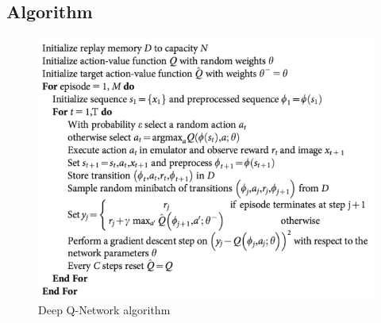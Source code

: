 \newline \subsection{Algorithm}
\begin{figure}[H]
    \centering
    \includegraphics[width=\textwidth]{images/dqnAlgo2.png}
    \caption{Deep Q-Network algorithm}
\end{figure}


